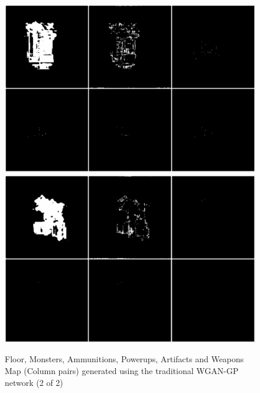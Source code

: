 \documentclass{Configuration_Files/PoliMi3i_thesis}
\begin{document}
\begin{figure}[H]
    \centering
    \includegraphics[width=1\textwidth]{wgan_sample3.jpg}
    \includegraphics[width=1\textwidth]{wgan_sample4.jpg}
    \caption[Samples generated using the traditional WGAN-GP architecture (2 of 2)]{Floor, Monsters, Ammunitions, Powerups, Artifacts and Weapons Map 
(Column pairs) generated using the traditional WGAN-GP network (2 of 2)}
    \label{fig:wgansample2}
\end{figure}
\end{document}
